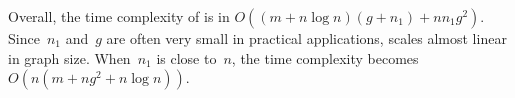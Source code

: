 Overall, the time complexity of \Basic is in $O((m+n\log{n})(g+n_1)+nn_1g^2)$. Since~$n_1$ and~$g$ are often very small in practical applications, \Basic scales almost linear in graph size. When~$n_1$ is close to~$n$, the time complexity becomes $O(n(m+ng^2+n\log n))$.

